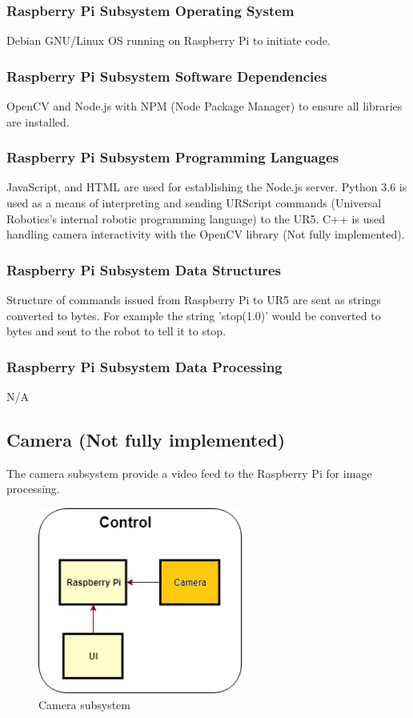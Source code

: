 \subsubsection{Raspberry Pi Subsystem Operating System}
Debian GNU/Linux OS running on Raspberry Pi to initiate code.

\subsubsection{Raspberry Pi Subsystem Software Dependencies}
OpenCV and Node.js with NPM (Node Package Manager) to ensure all libraries are installed.

\subsubsection{Raspberry Pi Subsystem Programming Languages}
JavaScript, and HTML are used for establishing the Node.js server. Python 3.6 is used as a means of interpreting and sending URScript commands (Universal Robotics's internal robotic programming language) to the UR5. C++ is used handling camera interactivity with the OpenCV library (Not fully implemented).

\subsubsection{Raspberry Pi Subsystem Data Structures}
Structure of commands issued from Raspberry Pi to UR5 are sent as strings converted to bytes. For example the string 'stop(1.0)' would be converted to bytes and sent to the robot to tell it to stop.

\subsubsection{Raspberry Pi Subsystem Data Processing}
N/A

\subsection{Camera (Not fully implemented)}
The camera subsystem provide a video feed to the Raspberry Pi for image processing.

\begin{figure}[h!]
	\centering
 	\includegraphics[width=0.60\textwidth]{images/Control_Layer_Camera}
 \caption{Camera subsystem}
\end{figure}

